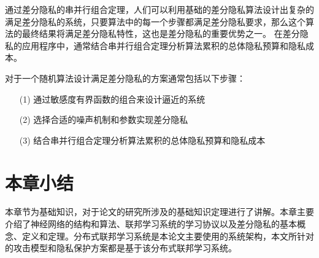 通过差分隐私的串并行组合定理，人们可以利用基础的差分隐私算法设计出复杂的满足差分隐私的系统，只要算法中的每一个步骤都满足差分隐私要求，那么这个算法的最终结果将满足差分隐私特性，这也是差分隐私的重要优势之一。 在差分隐私的应用程序中，通常结合串并行组合定理分析算法累积的总体隐私预算和隐私成本。

对于一个随机算法设计满足差分隐私的方案通常包括以下步骤：
\begin{enumerate}
\item [(1)] 通过敏感度有界函数的组合来设计逼近的系统
\item [(2)] 选择合适的噪声机制和参数实现差分隐私
\item [(3)] 结合串并行组合定理分析算法累积的总体隐私预算和隐私成本
\end{enumerate}


\section{本章小结}
本章节为基础知识，对于论文的研究所涉及的基础知识定理进行了讲解。本章主要介绍了神经网络的结构和算法、联邦学习系统的学习协议以及差分隐私的基本概念、定义和定理。分布式联邦学习系统是本论文主要使用的系统架构，本文所针对的攻击模型和隐私保护方案都是基于该分布式联邦学习系统。
